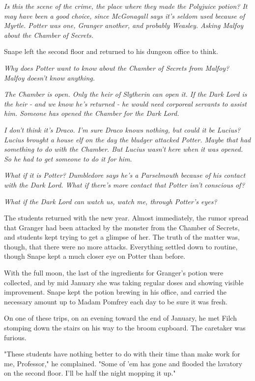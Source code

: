 \emph{Is this the scene of the crime, the place where they made the Polyjuice potion? It may have been a good choice, since McGonagall says it's seldom used because of Myrtle. Potter was one, Granger another, and probably Weasley. Asking Malfoy about the Chamber of Secrets.}

Snape left the second floor and returned to his dungeon office to think.

\emph{Why does Potter want to know about the Chamber of Secrets from Malfoy? Malfoy doesn't know anything.}

\emph{The Chamber is open. Only the heir of Slytherin can open it. If the Dark Lord is the heir - and we know he's returned - he would need corporeal servants to assist him. Someone has opened the Chamber for the Dark Lord.}

\emph{I don't think it's Draco. I'm sure Draco knows nothing, but could it be Lucius? Lucius brought a house elf on the day the bludger attacked Potter. Maybe that had something to do with the Chamber. But Lucius wasn't here when it was opened. So he had to get someone to do it for him.}

\emph{What if it is Potter? Dumbledore says he's a Parselmouth because of his contact with the Dark Lord. What if there's more contact that Potter isn't conscious of?}

\emph{What if the Dark Lord can watch us, watch me, through Potter's eyes?}

\sbreak

The students returned with the new year. Almost immediately, the rumor spread that Granger had been attacked by the monster from the Chamber of Secrets, and students kept trying to get a glimpse of her. The truth of the matter was, though, that there were no more attacks. Everything settled down to routine, though Snape kept a much closer eye on Potter than before.

With the full moon, the last of the ingredients for Granger's potion were collected, and by mid January she was taking regular doses and showing visible improvement. Snape kept the potion brewing in his office, and carried the necessary amount up to Madam Pomfrey each day to be sure it was fresh.

On one of these trips, on an evening toward the end of January, he met Filch stomping down the stairs on his way to the broom cupboard. The caretaker was furious.

"These students have nothing better to do with their time than make work for me, Professor," he complained. "Some of 'em has gone and flooded the lavatory on the second floor. I'll be half the night mopping it up."

